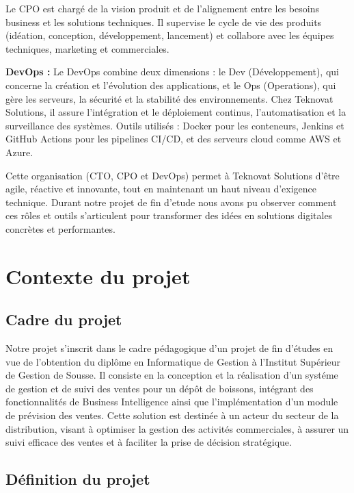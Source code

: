 Le CPO est chargé de la vision produit et de l'alignement entre les besoins business et les 
solutions techniques. Il supervise le cycle de vie des produits (idéation, conception, 
développement, lancement) et collabore avec les équipes techniques, marketing et commerciales.

\bigskip

\textbf{DevOps :} Le DevOps combine deux dimensions : le Dev (Développement), qui concerne 
la création et l'évolution des applications, et le Ops (Operations), qui gère les serveurs, 
la sécurité et la stabilité des environnements. Chez Teknovat Solutions, il assure l'intégration 
et le déploiement continus, l'automatisation et la surveillance des systèmes. Outils utilisés : 
Docker pour les conteneurs, Jenkins et GitHub Actions pour les pipelines CI/CD, et des serveurs 
cloud comme AWS et Azure.

\bigskip
Cette organisation (CTO, CPO et DevOps) permet à Teknovat Solutions d'être agile, réactive et 
innovante, tout en maintenant un haut niveau d'exigence technique. Durant notre projet de fin d'etude  
nous avons pu  observer comment ces rôles et outils s'articulent pour transformer des idées en solutions 
digitales concrètes et performantes.

\newpage
\section{Contexte du projet}
\label{sec:ch1:contexte}

\subsection{Cadre du projet}

Notre projet s'inscrit dans le cadre pédagogique d'un projet de fin d'études en vue
de l'obtention du diplôme en Informatique de Gestion à l'Institut Supérieur de
Gestion de Sousse. Il consiste en la conception et la réalisation d'un systéme de gestion et de suivi des ventes pour un dépôt de boissons, intégrant des
fonctionnalités de Business Intelligence ainsi que l'implémentation d'un module
de prévision des ventes. Cette solution est destinée à un acteur du secteur de
la distribution, visant à optimiser la gestion des activités commerciales, à
assurer un suivi efficace des ventes et à faciliter la prise de décision stratégique.

\subsection{Définition du projet}

